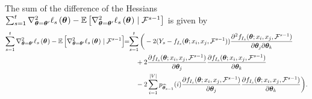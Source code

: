 \begin{lemma}
\label{lemma:support-lemma3}
The sum of the difference of the Hessians $\sum_{s=1}^{t} \nabla_{\bm{\theta} = \bm{\theta}'}^{2} \ell_{s}\left(\bm{\theta}^{}\right)-\mathbb{E}\left[\nabla_{\bm{\theta}=\bm{\theta}'}^{2} \ell_{s}\left(\bm{\theta}^{}\right) \mid \mathcal{F}^{s-1}\right]$ is given by 
\begin{align*}
    \sum_{s=1}^{t}\nabla_{\bm{\theta} = \bm{\theta}'}^{2} \ell_{s}\left(\bm{\theta}^{}\right)-\mathbb{E}\left[\nabla_{\bm{\theta}=\bm{\theta}'}^{2} \ell_{s}\left(\bm{\theta}^{}\right) \mid \mathcal{F}^{s-1}\right] \!\! &=\!\! \sum_{s=1}^t\bigg( -2(Y_s - f_{I_s}(\bm{\theta}; x_i, x_j, \mathcal{F}^{s-1}))\dfrac{\partial^2 f_{I_s}(\bm{\theta}; x_i, x_j, \mathcal{F}^{s-1})}{\partial \bm{\theta}_j\partial\bm{\theta}_k} \\
    &\qquad+ 2\dfrac{\partial f_{I_s}(\bm{\theta}; x_i, x_j, \mathcal{F}^{s-1})}{\partial \bm{\theta}_j}\dfrac{\partial f_{I_s}(\bm{\theta}; x_i, x_j, \mathcal{F}^{s-1})}{\partial \bm{\theta}_k} \\
    &\qquad- 2 \sum_{i=1}^{|V|} p_{{\widehat{\bm{\theta}}}_{s-1}}(i)\dfrac{\partial f_{I_s}(\bm{\theta} ; x_i, x_j, \mathcal{F}^{s-1})}{\partial \bm{\theta}_j}\dfrac{\partial f_{I_s}(\bm{\theta} ; x_i, x_j, \mathcal{F}^{s-1})}{\partial \bm{\theta}_k}\bigg).
\end{align*}
\end{lemma}

